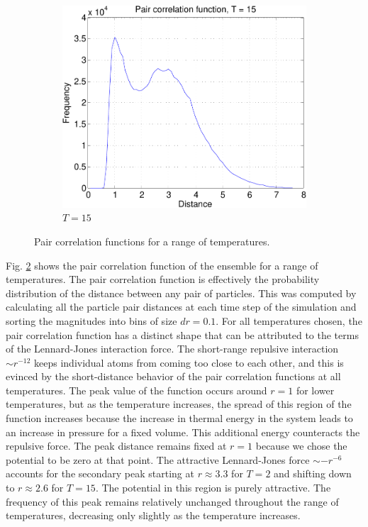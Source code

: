 \documentclass[10pt,a4paper]{article}
\begin{document}
\begin{figure}[ht!]
\begin{subfigure}[b]{0.3\linewidth}
  \includegraphics[width=\textwidth]{figs/pair_corr_Teq15-crop.pdf}
  \caption{$T=15$}
  \label{fig:pcorr15}
 \end{subfigure}
 
 \caption{Pair correlation functions for a range of temperatures.}
 \label{fig:pcorrs}
\end{figure}

Fig. \ref{fig:pcorrs} shows the pair correlation function of the ensemble for a range of temperatures. The pair correlation function is effectively the probability distribution of the distance between any pair of particles. This was computed by calculating all the particle pair distances at each time step of the simulation and sorting the magnitudes into bins of size $dr=0.1$. For all temperatures chosen, the pair correlation function has a distinct shape that can be attributed to the terms of the Lennard-Jones interaction force. The short-range repulsive interaction $\sim r^{-12}$ keeps individual atoms from coming too close to each other, and this is evinced by the short-distance behavior of the pair correlation functions at all temperatures. The peak value of the function occurs around $r=1$ for lower temperatures, but as the temperature increases, the spread of this region of the function increases because the increase in thermal energy in the system leads to an increase in pressure for a fixed volume. This additional energy counteracts the repulsive force. The peak distance remains fixed at $r=1$ because we chose the potential to be zero at that point. The attractive Lennard-Jones force $\sim -r^{-6}$ accounts for the secondary peak starting at $r\approx3.3$ for $T=2$ and shifting down to $r\approx 2.6$ for $T=15$. The potential in this region is purely attractive. The frequency of this peak remains relatively unchanged throughout the range of temperatures, decreasing only slightly as the temperature increases.
 
\end{document}
